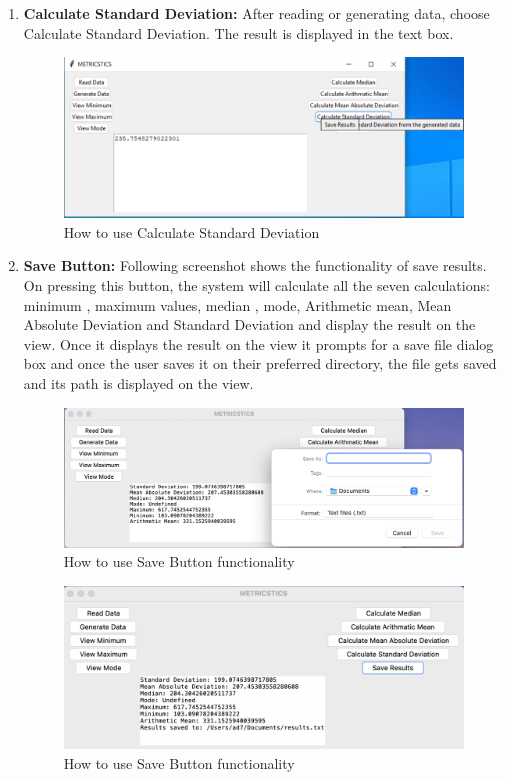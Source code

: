 \documentclass{article}
\begin{document}
\begin{enumerate}
    \item \textbf{Calculate Standard Deviation:} After reading or generating data, choose Calculate Standard Deviation. The result is displayed in the text box.

    \begin{figure}[h]
        \centering
        \includegraphics[width=0.9\linewidth]{CalculateStandardDeviation.png}
        \caption{How to use Calculate Standard Deviation}
    \end{figure}
    \vspace{20em}

\item \textbf{Save Button:} Following screenshot shows the functionality of save results. On pressing this button, the system will calculate all the seven calculations:  minimum ,  maximum values, median , mode, Arithmetic mean, Mean Absolute Deviation and Standard Deviation  and display the result on the view. Once it displays the result on the view it prompts for a save file dialog box and once the user saves it on their preferred directory, the file gets saved and its path is displayed on the view.




\begin{figure}[h]
        \centering
        \includegraphics[width=0.9\linewidth]{Save_0.png}
        \caption{How to use Save Button functionality}
    \end{figure}
    \vspace{20em}

\begin{figure}[h]
        \centering
        \includegraphics[width=0.9\linewidth]{Save_1.png}
        \caption{How to use Save Button functionality}
    \end{figure}
    \vspace{20em}


\end{enumerate}
\end{document}
